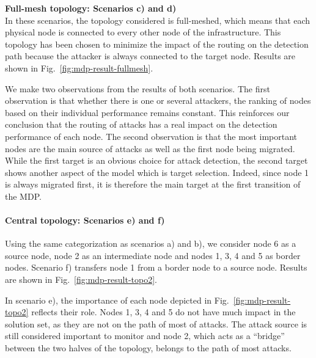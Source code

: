 \textbf{Full-mesh topology: Scenarios c) and d) \\}
In these scenarios, the topology considered is full-meshed, which means that each physical node is connected to every other node of the infrastructure. This topology has been chosen to minimize the impact of the routing on the detection path because the attacker is always connected to the target node.
Results are shown in Fig.~\ref{fig:mdp-result-fullmesh}.

We make two observations from the results of both scenarios.
The first observation is that whether there is one or several attackers, the ranking of nodes based on their individual performance remains constant. This reinforces our conclusion that the routing of attacks has a real impact on the detection performance of each node.
The second observation is that the most important nodes are the main source of attacks as well as the first node being migrated. While the first target is an obvious choice for attack detection, the second target shows another aspect of the model which is target selection. Indeed, since node 1 is always migrated first, it is therefore the main target at the first transition of the MDP.



\paragraph{Central topology: Scenarios e) and f)}
Using the same categorization as scenarios a) and b), we consider node 6 as a source node, node 2 as an intermediate node and nodes 1, 3, 4 and 5 as border nodes. Scenario f) transfers node 1 from a border node to a source node. Results are shown in Fig.~\ref{fig:mdp-result-topo2}.

In scenario e), the importance of each node depicted in Fig.~\ref{fig:mdp-result-topo2} reflects their role. Nodes 1, 3, 4 and 5 do not have much impact in the solution set, as they are not on the path of most of attacks. The attack source is still considered important to monitor and node 2, which acts as a ``bridge'' between the two halves of the topology, belongs to the path of most attacks.


